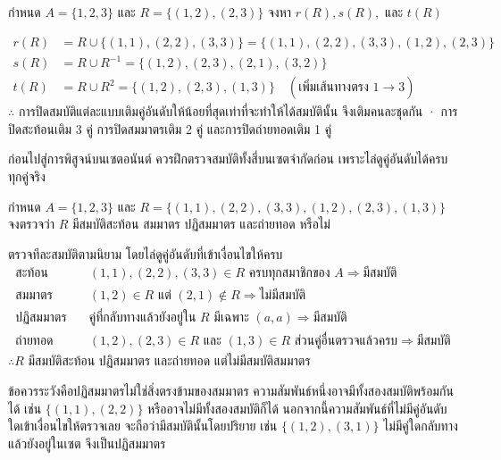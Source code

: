 \begin{ex}
\label{ex:relation-closure}
กำหนด $A = \{1, 2, 3\}$ และ $R = \{(1,2), (2,3)\}$ จงหา $r(R), s(R),$ และ $t(R)$
\end{ex}
\begin{solution}
\begin{align*}
r(R) &= R \cup \{(1,1), (2,2), (3,3)\} = \{(1,1),(2,2),(3,3),(1,2),(2,3)\}\\
s(R) &= R \cup R^{-1} = \{(1,2),(2,3),(2,1),(3,2)\}\\
t(R) &= R \cup R^2 = \{(1,2),(2,3),(1,3)\} \quad (\text{เพิ่มเส้นทางตรง } 1 \to 3)
\end{align*}
$\therefore$ การปิดสมบัติแต่ละแบบเติมคู่อันดับให้น้อยที่สุดเท่าที่จะทำให้ได้สมบัตินั้น จึงเติมคนละชุดกัน · การปิดสะท้อนเติม 3 คู่ การปิดสมมาตรเติม 2 คู่ และการปิดถ่ายทอดเติม 1 คู่ \solhere
\end{solution}

ก่อนไปสู่การพิสูจน์บนเซตอนันต์ ควรฝึกตรวจสมบัติทั้งสี่บนเซตจำกัดก่อน เพราะไล่ดูคู่อันดับได้ครบทุกคู่จริง

\begin{ex}
\label{ex:four-properties-finite}
กำหนด $A = \{1,2,3\}$ และ $R = \{(1,1),(2,2),(3,3),(1,2),(2,3),(1,3)\}$ จงตรวจว่า $R$ มีสมบัติสะท้อน สมมาตร ปฏิสมมาตร และถ่ายทอด หรือไม่
\end{ex}
\begin{solution}
ตรวจทีละสมบัติตามนิยาม โดยไล่ดูคู่อันดับที่เข้าเงื่อนไขให้ครบ
\begin{align*}
\text{สะท้อน} &\quad (1,1),(2,2),(3,3) \in R \text{ ครบทุกสมาชิกของ } A \Rightarrow \text{มีสมบัติ}\\
\text{สมมาตร} &\quad (1,2) \in R \text{ แต่ } (2,1) \notin R \Rightarrow \text{ไม่มีสมบัติ}\\
\text{ปฏิสมมาตร} &\quad \text{คู่ที่กลับทางแล้วยังอยู่ใน } R \text{ มีเฉพาะ } (a,a) \Rightarrow \text{มีสมบัติ}\\
\text{ถ่ายทอด} &\quad (1,2),(2,3) \in R \text{ และ } (1,3) \in R \text{ ส่วนคู่อื่นตรวจแล้วครบ} \Rightarrow \text{มีสมบัติ}
\end{align*}
$\therefore R$ มีสมบัติสะท้อน ปฏิสมมาตร และถ่ายทอด แต่ไม่มีสมบัติสมมาตร

ข้อควรระวังคือปฏิสมมาตรไม่ใช่สิ่งตรงข้ามของสมมาตร ความสัมพันธ์หนึ่งอาจมีทั้งสองสมบัติพร้อมกันได้ เช่น $\{(1,1),(2,2)\}$ หรืออาจไม่มีทั้งสองสมบัติก็ได้ นอกจากนี้ความสัมพันธ์ที่ไม่มีคู่อันดับใดเข้าเงื่อนไขให้ตรวจเลย จะถือว่ามีสมบัตินั้นโดยปริยาย เช่น $\{(1,2),(3,1)\}$ ไม่มีคู่ใดกลับทางแล้วยังอยู่ในเซต จึงเป็นปฏิสมมาตร \solhere
\end{solution}

